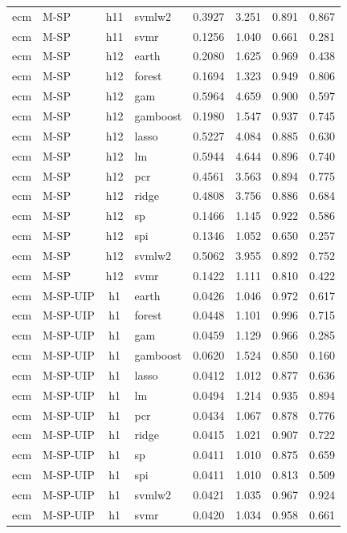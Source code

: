 \begin{ThreePartTable}
\begin{longtable}[t]{llclcccc}
ecm & M-SP & h11 & svmlw2 & 0.3927 & 3.251 & 0.891 & 0.867\\
ecm & M-SP & h11 & svmr & 0.1256 & 1.040 & 0.661 & 0.281\\
\addlinespace
ecm & M-SP & h12 & earth & 0.2080 & 1.625 & 0.969 & 0.438\\
ecm & M-SP & h12 & forest & 0.1694 & 1.323 & 0.949 & 0.806\\
ecm & M-SP & h12 & gam & 0.5964 & 4.659 & 0.900 & 0.597\\
ecm & M-SP & h12 & gamboost & 0.1980 & 1.547 & 0.937 & 0.745\\
ecm & M-SP & h12 & lasso & 0.5227 & 4.084 & 0.885 & 0.630\\
ecm & M-SP & h12 & lm & 0.5944 & 4.644 & 0.896 & 0.740\\
ecm & M-SP & h12 & pcr & 0.4561 & 3.563 & 0.894 & 0.775\\
ecm & M-SP & h12 & ridge & 0.4808 & 3.756 & 0.886 & 0.684\\
ecm & M-SP & h12 & sp & 0.1466 & 1.145 & 0.922 & 0.586\\
ecm & M-SP & h12 & spi & 0.1346 & 1.052 & 0.650 & 0.257\\
ecm & M-SP & h12 & svmlw2 & 0.5062 & 3.955 & 0.892 & 0.752\\
ecm & M-SP & h12 & svmr & 0.1422 & 1.111 & 0.810 & 0.422\\
\addlinespace
ecm & M-SP-UIP & h1 & earth & 0.0426 & 1.046 & 0.972 & 0.617\\
ecm & M-SP-UIP & h1 & forest & 0.0448 & 1.101 & 0.996 & 0.715\\
ecm & M-SP-UIP & h1 & gam & 0.0459 & 1.129 & 0.966 & 0.285\\
ecm & M-SP-UIP & h1 & gamboost & 0.0620 & 1.524 & 0.850 & 0.160\\
ecm & M-SP-UIP & h1 & lasso & 0.0412 & 1.012 & 0.877 & 0.636\\
ecm & M-SP-UIP & h1 & lm & 0.0494 & 1.214 & 0.935 & 0.894\\
ecm & M-SP-UIP & h1 & pcr & 0.0434 & 1.067 & 0.878 & 0.776\\
ecm & M-SP-UIP & h1 & ridge & 0.0415 & 1.021 & 0.907 & 0.722\\
ecm & M-SP-UIP & h1 & sp & 0.0411 & 1.010 & 0.875 & 0.659\\
ecm & M-SP-UIP & h1 & spi & 0.0411 & 1.010 & 0.813 & 0.509\\
ecm & M-SP-UIP & h1 & svmlw2 & 0.0421 & 1.035 & 0.967 & 0.924\\
ecm & M-SP-UIP & h1 & svmr & 0.0420 & 1.034 & 0.958 & 0.661\\

\end{longtable}
\end{ThreePartTable}
